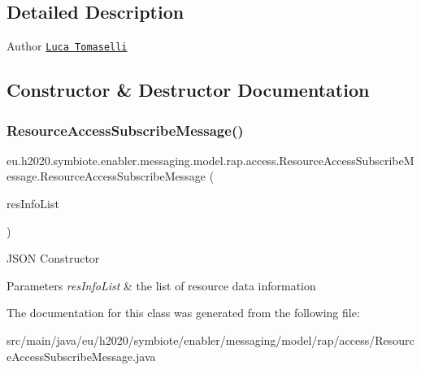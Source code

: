 \subsection{Detailed Description}
\begin{DoxyAuthor}{Author}
\href{mailto:l.tomaselli@nextworks.it}{\tt Luca Tomaselli} 
\end{DoxyAuthor}


\subsection{Constructor \& Destructor Documentation}
\mbox{\label{classeu_1_1h2020_1_1symbiote_1_1enabler_1_1messaging_1_1model_1_1rap_1_1access_1_1ResourceAccessSubscribeMessage_aebf31d18c07e21b854c7ebe065f5f233}} 
\subsubsection{\texorpdfstring{Resource\+Access\+Subscribe\+Message()}{ResourceAccessSubscribeMessage()}}
{\footnotesize\ttfamily eu.\+h2020.\+symbiote.\+enabler.\+messaging.\+model.\+rap.\+access.\+Resource\+Access\+Subscribe\+Message.\+Resource\+Access\+Subscribe\+Message (\begin{DoxyParamCaption}\item[{@Json\+Property(\char`\"{}resource\+Info\char`\"{}) List$<$ \hyperlink{classeu_1_1h2020_1_1symbiote_1_1enabler_1_1messaging_1_1model_1_1rap_1_1db_1_1ResourceInfo}{Resource\+Info} $>$}]{res\+Info\+List }\end{DoxyParamCaption})}

J\+S\+ON Constructor 
\begin{DoxyParams}{Parameters}
{\em res\+Info\+List} & the list of resource data information \\
\hline
\end{DoxyParams}


The documentation for this class was generated from the following file\+:\begin{DoxyCompactItemize}
\item 
src/main/java/eu/h2020/symbiote/enabler/messaging/model/rap/access/Resource\+Access\+Subscribe\+Message.\+java\end{DoxyCompactItemize}

